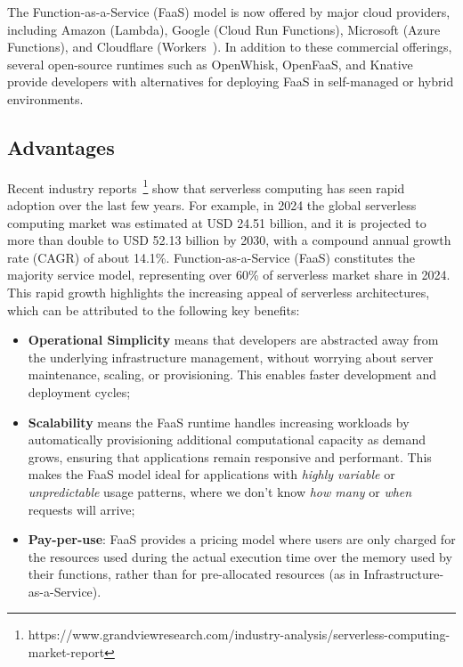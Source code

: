 The Function-as-a-Service (FaaS) model is now offered by major cloud providers, including Amazon (Lambda\cite{aws_lambda}), Google (Cloud Run Functions\cite{google_cloud_run_functions}), Microsoft (Azure Functions\cite{azure_functions}), and Cloudflare (Workers~\cite{cloudflare_workers}). In addition to these commercial offerings, several open-source runtimes such as OpenWhisk\cite{open_whisk}, OpenFaaS\cite{openfaas}, and Knative\cite{knative} provide developers with alternatives for deploying FaaS in self-managed or hybrid environments.

\subsection{Advantages}
Recent industry reports~\footnote{https://www.grandviewresearch.com/industry-analysis/serverless-computing-market-report} show that serverless computing has seen rapid adoption over the last few years. For example, in 2024 the global serverless computing market was estimated at USD 24.51 billion, and it is projected to more than double to USD 52.13 billion by 2030, with a compound annual growth rate (CAGR) of about 14.1\%. Function-as-a-Service (FaaS) constitutes the majority service model, representing over 60\% of serverless market share in 2024. This rapid growth highlights the increasing appeal of serverless architectures, which can be attributed to the following key benefits:

\begin{itemize}
    \item{\textbf{Operational Simplicity} means that developers are abstracted away from the underlying infrastructure management, without worrying about server maintenance, scaling, or provisioning. This enables faster development and deployment cycles;}
    \item{\textbf{Scalability} means the FaaS runtime handles increasing workloads by automatically provisioning additional computational capacity as demand grows, ensuring that applications remain responsive and performant. This makes the FaaS model ideal for applications with \textit{highly variable} or \textit{unpredictable} usage patterns, where we don't know \textit{how many} or \textit{when} requests will arrive;}
    \item{\textbf{Pay-per-use}: FaaS provides a pricing model where users are only charged for the resources used during the actual execution time over the memory used by their functions, rather than for pre-allocated resources (as in Infrastructure-as-a-Service).}
\end{itemize}

